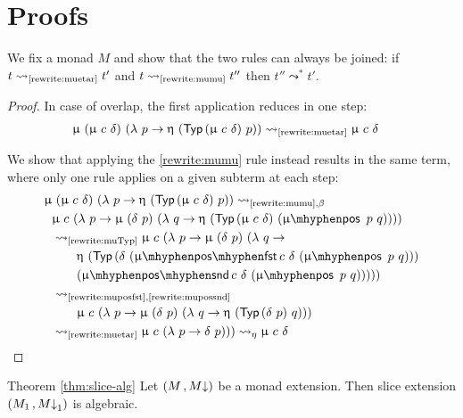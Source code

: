 \section{Proofs}

\begin{lem}
  \label{proof:muetarmumu-proof}
  We fix a monad $M$ and show that the two rules can always be joined:
  if $t \leadsto_{\text{\ref{rewrite:muetar}}} t'$ and 
  $t \leadsto_{\text{\ref{rewrite:mumu}}} t''$
  then $t'' \leadsto^* t'$.
\end{lem}

\begin{proof}
  In case of overlap, the first application reduces in one step:
  \begin{align*}
    \upmu&\ (\upmu\ c\ \delta)\ (\lambda\ p \to \upeta\ (\Typ (\upmu\ c\ \delta)\ p)) \leadsto_{\text{\ref{rewrite:muetar}}} \upmu\ c\ \delta
  \end{align*}

  We show that applying the \ref{rewrite:mumu} rule instead results in the same term,
  where only one rule applies on a given subterm at each step:
  \begin{align*}
    \upmu&\ (\upmu\ c\ \delta)\ (\lambda\ p \to \upeta\ (\Typ (\upmu\ c\ \delta)\ p)) \leadsto_{\text{\ref{rewrite:mumu}},\beta} \\
    &\upmu\ c\ (\lambda\ p \to \upmu\ (\delta\ p)\ 
        (\lambda\ q \to \upeta\ (\Typ (\upmu\ c\ \delta)~(\mupos\ p\ q)))) \\
    &\leadsto_{\text{\ref{rewrite:muTyp}}} \upmu\ c\ (\lambda\ p \to \upmu\ (\delta\ p)\ 
        (\lambda\ q \to \\
        &\quad\quad \upeta\ (\Typ (\delta\ (\muposfst c\ \delta\ (\mupos\ p\ q)))\\
        &\quad\quad (\mupossnd c\ \delta\ (\mupos\ p\ q)))))\\
    &\leadsto_{\text{\eqref{rewrite:muposfst},\ref{rewrite:mupossnd}}}\\
    &\quad\quad\upmu\ c\ (\lambda\ p \to \upmu\ (\delta\ p)\
        (\lambda\ q \to \upeta\ (\Typ (\delta\ p)\ q)))\\
    &\leadsto_{\text{\ref{rewrite:muetar}}}\upmu\ c\ (\lambda\ p \to \delta\ p))) \leadsto_{\eta} \upmu\ c\ \delta
  \end{align*}  
\end{proof}

\begin{thm-apdx}{Theorem \ref{thm:slice-alg}}
  Let $(M \,, M{\downarrow})$ be a monad extension.  Then slice extension
  $(M_1 \,, M{\downarrow}_1)$ is algebraic.
\end{thm-apdx}

